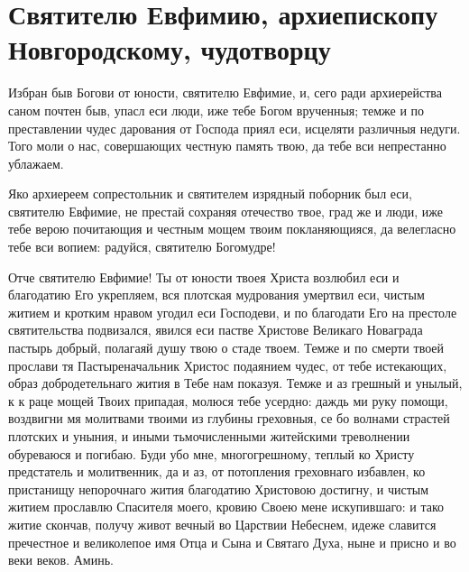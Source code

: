 \section{Святителю Евфимию, архиепископу Новгородскому, чудотворцу}\begin{mymulticols}


Избран быв Богови от юности, святителю Евфимие, и, сего ради архиерейства саном почтен быв, упасл еси люди, иже тебе Богом врученныя; темже и по преставлении чудес дарования от Господа приял еси, исцеляти различныя недуги. Того моли о нас, совершающих честную память твою, да тебе вси непрестанно ублажаем.


Яко архиереем сопрестольник и святителем изрядный поборник был еси, святителю Евфимие, не престай сохраняя отечество твое, град же и люди, иже тебе верою почитающия и честным мощем твоим покланяющияся, да велегласно тебе вси вопием: радуйся, святителю Богомудре!


Отче святителю Евфимие! Ты от юности твоея Христа возлюбил еси и благодатию Его укрепляем, вся плотская мудрования умертвил еси, чистым житием и кротким нравом угодил еси Господеви, и по благодати Его на престоле святительства подвизался, явился еси пастве Христове Великаго Новаграда пастырь добрый, полагаяй душу твою о стаде твоем. Темже и по смерти твоей прослави тя Пастыреначальник Христос подаянием чудес, от тебе истекающих, образ добродетельнаго жития в Тебе нам показуя. Темже и аз грешный и унылый, к к раце мощей Твоих припадая, молюся тебе усердно: даждь ми руку помощи, воздвигни мя молитвами твоими из глубины греховныя, се бо волнами страстей плотских и уныния, и иными тьмочисленными житейскими треволнении обуреваюся и погибаю. Буди убо мне, многогрешному, теплый ко Христу предстатель и молитвенник, да и аз, от потопления греховнаго избавлен, ко пристанищу непорочнаго жития благодатию Христовою достигну, и чистым житием прославлю Спасителя моего, кровию Своею мене искупившаго: и тако житие скончав, получу живот вечный во Царствии Небеснем, идеже славится пречестное и великолепое имя Отца и Сына и Святаго Духа, ныне и присно и во веки веков. Аминь. 

\end{mymulticols}

\mychapterending

